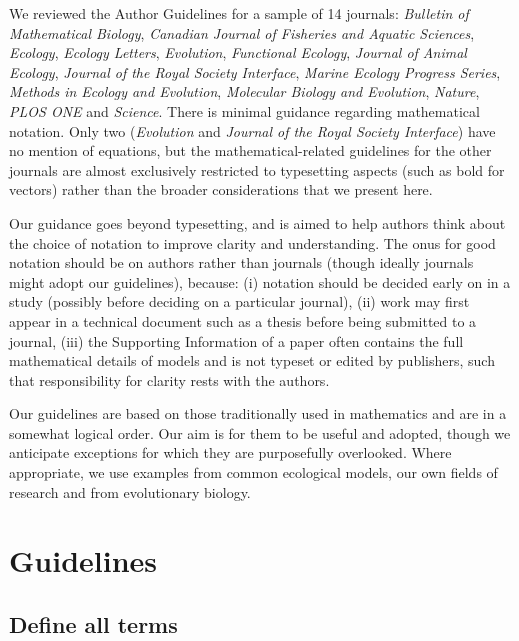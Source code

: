 \documentclass[12pt]{article}
\begin{document}
We reviewed the Author Guidelines for a sample of 14 journals:
\emph{Bulletin of Mathematical Biology},
\emph{Canadian Journal of Fisheries and Aquatic Sciences},
\emph{Ecology},
\emph{Ecology Letters},
\emph{Evolution},
\emph{Functional Ecology},
\emph{Journal of Animal Ecology},
\emph{Journal of the Royal Society Interface},
\emph{Marine Ecology Progress Series},
\emph{Methods in Ecology and Evolution},
\emph{Molecular Biology and Evolution},
\emph{Nature},
\emph{PLOS ONE} and
\emph{Science}.
There is minimal guidance regarding mathematical notation. Only two
(\emph{Evolution} and \emph{Journal of the Royal Society Interface}) have
no mention of equations, but the
mathematical-related guidelines for
the other journals are almost exclusively restricted to typesetting aspects
(such as bold for vectors) rather than the broader considerations that we
present here.

Our guidance goes beyond typesetting, and is aimed to help authors
think about the choice of notation to improve clarity and understanding.
The onus for good notation should be on authors rather than journals (though
ideally journals might adopt our guidelines),
because:
(i) notation should be decided early on in a study (possibly before deciding on a
particular journal),
(ii) work may first appear in a technical document such as a thesis before being
submitted to a journal,
(iii) the 
Supporting Information of a paper often contains the full mathematical details of
models and is not typeset or edited by publishers, such that responsibility for
clarity rests with the authors.

Our guidelines are based on those traditionally used in mathematics
and are in a somewhat logical order. Our aim
is for them to be useful and adopted, though we anticipate exceptions for 
which they are purposefully overlooked.
Where appropriate, we use examples from common ecological models,
our own fields of research and from evolutionary biology.

\section*{Guidelines}

\subsection*{Define all terms}
\end{document}
